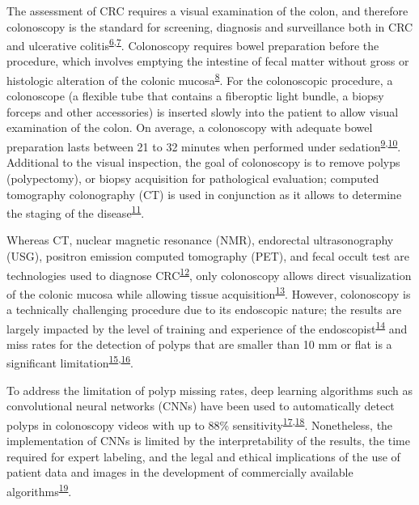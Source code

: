 \documentclass[11pt]{umnthesis}
\begin{document}
The assessment of CRC requires a visual examination of the colon, and therefore colonoscopy is the standard for screening, diagnosis and surveillance both in CRC and ulcerative colitis\textsuperscript{\protect\hyperlink{ref-siegel2017}{6},\protect\hyperlink{ref-lieberman2014}{7}}. Colonoscopy requires bowel preparation before the procedure, which involves emptying the intestine of fecal matter without gross or histologic alteration of the colonic mucosa\textsuperscript{\protect\hyperlink{ref-saltzman2015}{8}}. For the colonoscopic procedure, a colonoscope (a flexible tube that contains a fiberoptic light bundle, a biopsy forceps and other accessories) is inserted slowly into the patient to allow visual examination of the colon. On average, a colonoscopy with adequate bowel preparation lasts between 21 to 32 minutes when performed under sedation\textsuperscript{\protect\hyperlink{ref-lin2017}{9},\protect\hyperlink{ref-shehadeh2020}{10}}. Additional to the visual inspection, the goal of colonoscopy is to remove polyps (polypectomy), or biopsy acquisition for pathological evaluation; computed tomography colonography (CT) is used in conjunction as it allows to determine the staging of the disease\textsuperscript{\protect\hyperlink{ref-duloy2018}{11}}.

Whereas CT, nuclear magnetic resonance (NMR), endorectal ultrasonography (USG), positron emission computed tomography (PET), and fecal occult test are technologies used to diagnose CRC\textsuperscript{\protect\hyperlink{ref-widerska2014}{12}}, only colonoscopy allows direct visualization of the colonic mucosa while allowing tissue acquisition\textsuperscript{\protect\hyperlink{ref-brown2019}{13}}. However, colonoscopy is a technically challenging procedure due to its endoscopic nature; the results are largely impacted by the level of training and experience of the endoscopist\textsuperscript{\protect\hyperlink{ref-boo2015}{14}} and miss rates for the detection of polyps that are smaller than 10 mm or flat is a significant limitation\textsuperscript{\protect\hyperlink{ref-leufkens2012}{15},\protect\hyperlink{ref-vanrijn2006}{16}}.

To address the limitation of polyp missing rates, deep learning algorithms such as convolutional neural networks (CNNs) have been used to automatically detect polyps in colonoscopy videos with up to 88\% sensitivity\textsuperscript{\protect\hyperlink{ref-tajbakhsh2016}{17},\protect\hyperlink{ref-bernal2017}{18}}. Nonetheless, the implementation of CNNs is limited by the interpretability of the results, the time required for expert labeling, and the legal and ethical implications of the use of patient data and images in the development of commercially available algorithms\textsuperscript{\protect\hyperlink{ref-pacal2020}{19}}.
\end{document}
